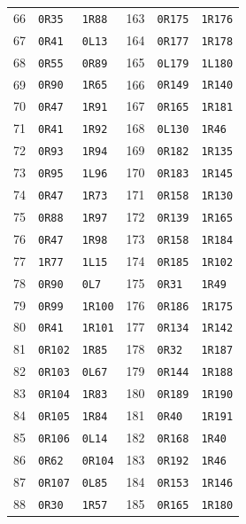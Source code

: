 \begin{longtable}{@{}rll@{\hspace{1.6cm}}rll@{}}
66 & \texttt{0R35} & \texttt{1R88} & 163 & \texttt{0R175} & \texttt{1R176} \\
67 & \texttt{0R41} & \texttt{0L13} & 164 & \texttt{0R177} & \texttt{1R178} \\
68 & \texttt{0R55} & \texttt{0R89} & 165 & \texttt{0L179} & \texttt{1L180} \\
69 & \texttt{0R90} & \texttt{1R65} & 166 & \texttt{0R149} & \texttt{1R140} \\
70 & \texttt{0R47} & \texttt{1R91} & 167 & \texttt{0R165} & \texttt{1R181} \\
71 & \texttt{0R41} & \texttt{1R92} & 168 & \texttt{0L130} & \texttt{1R46} \\
72 & \texttt{0R93} & \texttt{1R94} & 169 & \texttt{0R182} & \texttt{1R135} \\
73 & \texttt{0R95} & \texttt{1L96} & 170 & \texttt{0R183} & \texttt{1R145} \\
74 & \texttt{0R47} & \texttt{1R73} & 171 & \texttt{0R158} & \texttt{1R130} \\
75 & \texttt{0R88} & \texttt{1R97} & 172 & \texttt{0R139} & \texttt{1R165} \\
76 & \texttt{0R47} & \texttt{1R98} & 173 & \texttt{0R158} & \texttt{1R184} \\
77 & \texttt{1R77} & \texttt{1L15} & 174 & \texttt{0R185} & \texttt{1R102} \\
78 & \texttt{0R90} & \texttt{0L7} & 175 & \texttt{0R31} & \texttt{1R49} \\
79 & \texttt{0R99} & \texttt{1R100} & 176 & \texttt{0R186} & \texttt{1R175} \\
80 & \texttt{0R41} & \texttt{1R101} & 177 & \texttt{0R134} & \texttt{1R142} \\
81 & \texttt{0R102} & \texttt{1R85} & 178 & \texttt{0R32} & \texttt{1R187} \\
82 & \texttt{0R103} & \texttt{0L67} & 179 & \texttt{0R144} & \texttt{1R188} \\
83 & \texttt{0R104} & \texttt{1R83} & 180 & \texttt{0R189} & \texttt{1R190} \\
84 & \texttt{0R105} & \texttt{1R84} & 181 & \texttt{0R40} & \texttt{1R191} \\
85 & \texttt{0R106} & \texttt{0L14} & 182 & \texttt{0R168} & \texttt{1R40} \\
86 & \texttt{0R62} & \texttt{0R104} & 183 & \texttt{0R192} & \texttt{1R46} \\
87 & \texttt{0R107} & \texttt{0L85} & 184 & \texttt{0R153} & \texttt{1R146} \\
88 & \texttt{0R30} & \texttt{1R57} & 185 & \texttt{0R165} & \texttt{1R180} \\

\end{longtable}
